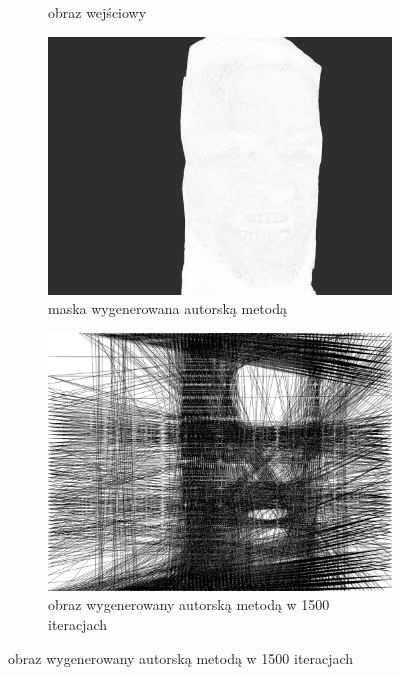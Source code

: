 \begin{figure}[H]
\begin{subfigure}{0.24\textwidth}
        \caption{obraz wejściowy}
        \label{comp-comp-joker-shining-d}
    \end{subfigure}
    \begin{subfigure}{0.24\textwidth}
        \centering
        \includegraphics[width = \textwidth]{img/6-comp/shining_mask_c20_inv0_bg10_obj1_ed1.png}
        \caption{maska wygenerowana autorską metodą}
        \label{comp-comp-joker-shining-e}
    \end{subfigure}
    \begin{subfigure}{0.24\textwidth}
        \centering
        \includegraphics[width = \textwidth]{img/6-comp/shining_r_i1500_c20_inv0_bg10_obj1_ed1.png}
        \caption{obraz wygenerowany autorską metodą w 1500 iteracjach}

\end{subfigure}
\end{figure}
